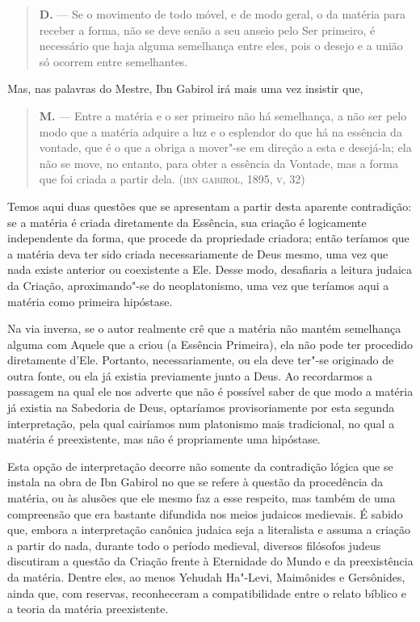 \begin{quote}
\textbf{D.} --- Se o movimento de todo móvel, e de modo geral, o da
matéria para receber a forma, não se deve senão a seu anseio pelo Ser
primeiro, é necessário que haja alguma semelhança entre eles, pois o
desejo e a união só ocorrem entre semelhantes.
\end{quote}

Mas, nas palavras do Mestre, Ibn Gabirol irá mais uma vez insistir
que,

\begin{quote}
\textbf{M.} --- Entre a matéria e o ser primeiro não há semelhança, a
não ser pelo modo que a matéria adquire a luz e o esplendor do que há
na essência da vontade, que é o que a obriga a mover"-se em direção a
esta e desejá-la; ela não se move, no entanto, para obter a essência
da Vontade, mas a forma que foi criada a partir dela. (\textsc{ibn}
\textsc{gabirol},
1895, \textsc{v}, 32)
\end{quote}

Temos aqui duas questões que se apresentam a partir desta aparente
contradição: se a matéria é criada diretamente da Essência, sua
criação é logicamente independente da forma, que procede da
propriedade criadora; então teríamos que a matéria deva ter sido
criada necessariamente de Deus mesmo, uma vez que nada existe
anterior ou coexistente a Ele. Desse modo, desafiaria a leitura
judaica da Criação, aproximando"-se do neoplatonismo, uma vez que
teríamos aqui a matéria como primeira hipóstase. 

Na via inversa, se o autor realmente crê que a matéria não mantém
semelhança alguma com Aquele que a criou (a Essência Primeira), ela
não pode ter procedido diretamente d'Ele. Portanto, necessariamente,
ou ela deve ter"-se originado de outra fonte, ou ela já existia
previamente junto a Deus. Ao recordarmos a passagem na qual ele nos
adverte que não é possível saber de que modo a matéria já existia na
Sabedoria de Deus, optaríamos provisoriamente por esta segunda
interpretação, pela qual cairíamos num platonismo mais tradicional,
no qual a matéria é preexistente, mas não é propriamente uma
hipóstase. 

Esta opção de interpretação decorre não somente da contradição lógica
que se instala na obra de Ibn Gabirol no que se refere à questão da
procedência da matéria, ou às alusões que ele mesmo faz a esse
respeito, mas também de uma compreensão que era bastante difundida
nos meios judaicos medievais. É sabido que, embora a interpretação
canônica judaica seja a literalista e assuma a criação a partir do
nada, durante todo o período medieval, diversos filósofos judeus
discutiram a questão da Criação frente à Eternidade do Mundo e da
preexistência da matéria. Dentre eles, ao menos Yehudah Ha"-Levi,
Maimônides e Gersônides, ainda que, com reservas, reconheceram a
compatibilidade entre o relato bíblico e a teoria da matéria
preexistente.

